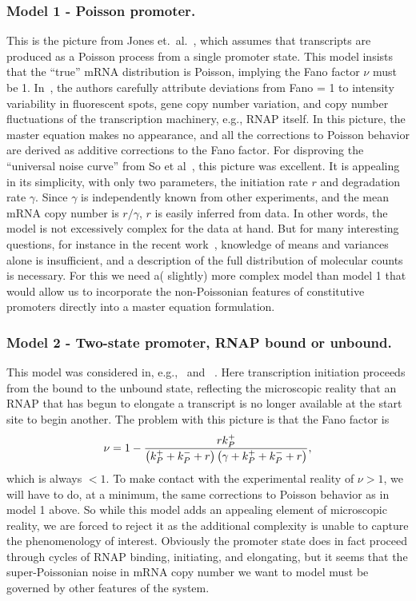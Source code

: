 \subsubsection{Model 1 - Poisson promoter.}
This is the picture from Jones et.\ al.~\cite{Jones2014}, which assumes that
transcripts are produced as a Poisson process from a single promoter state. This
model insists that the ``true'' mRNA distribution is Poisson, implying the Fano
factor $\nu$ must be 1. In~\cite{Jones2014}, the authors carefully attribute
deviations from Fano = 1 to intensity variability in fluorescent spots, gene
copy number variation, and copy number fluctuations of the transcription
machinery, e.g., RNAP itself. In this picture, the master equation makes no
appearance, and all the corrections to Poisson behavior are derived as additive
corrections to the Fano factor. For disproving the ``universal noise curve''
from So et al~\cite{So2011}, this picture was excellent. It is appealing in its
simplicity, with only two parameters, the initiation rate $r$ and degradation
rate $\gamma$. Since $\gamma$ is independently known from other experiments, and
the mean mRNA copy number is $r/\gamma$, $r$ is easily inferred from data. In
other words, the model is not excessively complex for the data at hand. But for
many interesting questions, for instance in the recent work~, knowledge of means and variances alone is
insufficient, and a description of the full distribution of molecular counts is
necessary. For this we need a( slightly) more complex model than model 1 that
would allow us to incorporate the non-Poissonian features of constitutive
promoters directly into a master equation formulation.

\subsubsection{Model 2 - Two-state promoter, RNAP bound or unbound.}
This model was considered in, e.g.,~\cite{Phillips2015a} and
~\cite{Phillips2019}. Here transcription initiation proceeds from the bound to
the unbound state, reflecting the microscopic reality that an RNAP that has
begun to elongate a transcript is no longer available at the start site to begin
another. The problem with this picture is that the Fano factor is
\begin{align}
    \nu = 1 -
        \frac{r{k}_{P}^{+}}
            {\left({k}_{P}^{+} + {k}_{P}^{-} + r\right)
             \left(\gamma + {k}_{P}^{+} + {k}_{P}^{-} + r\right)},
\end{align}
which is always $<1$. To make contact with the experimental reality of $\nu>1$,
we will have to do, at a minimum, the same corrections to Poisson behavior as in
model 1 above. So while this model adds an appealing element of microscopic
reality, we are forced to reject it as the additional complexity is unable to
capture the phenomenology of interest. Obviously the promoter state does in fact
proceed through cycles of RNAP binding, initiating, and elongating, but it seems
that the super-Poissonian noise in mRNA copy number we want to model must be
governed by other features of the system.

